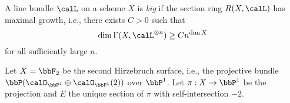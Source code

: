     \begin{definition}\label{def:big_line_bundle}
        A line bundle \(\calL\) on a scheme \(X\) is \emph{big} if the section ring \(R(X,\calL)\) has maximal growth, i.e., there exists \(C>0\) such that
        \[
            \dim \Gamma(X,\calL^{\otimes n}) \ge C n^{\dim X}
        \]
        for all sufficiently large \(n\).
        
    \end{definition}

    \begin{example}\label{eg:base_locus_-K_of_Hirzebruch_surface}
        Let \(X=\bbF_2\) be the second Hirzebruch surface, i.e., the projective bundle \(\bbP(\calO_{\bbP^1}\oplus \calO_{\bbP^1}(2))\) over \(\bbP^1\).
        Let \(\pi:X\to \bbP^1\) be the projection and \(E\) the unique section of \(\pi\) with self-intersection \(-2\).
        
    \end{example}



        
